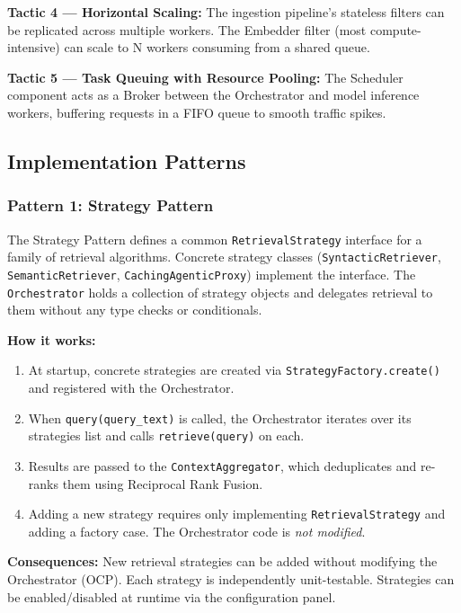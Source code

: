 \documentclass[11pt,a4paper]{article}
\begin{document}
\textbf{Tactic 4 --- Horizontal Scaling:} The ingestion pipeline's stateless filters can be replicated across multiple workers. The Embedder filter (most compute-intensive) can scale to N workers consuming from a shared queue.

\textbf{Tactic 5 --- Task Queuing with Resource Pooling:} The Scheduler component acts as a Broker between the Orchestrator and model inference workers, buffering requests in a FIFO queue to smooth traffic spikes.

\subsection{Implementation Patterns}

\subsubsection{Pattern 1: Strategy Pattern}

The Strategy Pattern defines a common \texttt{RetrievalStrategy} interface for a family of retrieval algorithms. Concrete strategy classes (\texttt{SyntacticRetriever}, \texttt{SemanticRetriever}, \texttt{CachingAgenticProxy}) implement the interface. The \texttt{Orchestrator} holds a collection of strategy objects and delegates retrieval to them without any type checks or conditionals.

\textbf{How it works:}
\begin{enumerate}
    \item At startup, concrete strategies are created via \texttt{StrategyFactory.create()} and registered with the Orchestrator.
    \item When \texttt{query(query\_text)} is called, the Orchestrator iterates over its strategies list and calls \texttt{retrieve(query)} on each.
    \item Results are passed to the \texttt{ContextAggregator}, which deduplicates and re-ranks them using Reciprocal Rank Fusion.
    \item Adding a new strategy requires only implementing \texttt{RetrievalStrategy} and adding a factory case. The Orchestrator code is \emph{not modified}.
\end{enumerate}

\textbf{Consequences:} New retrieval strategies can be added without modifying the Orchestrator (OCP). Each strategy is independently unit-testable. Strategies can be enabled/disabled at runtime via the configuration panel.
\end{document}
